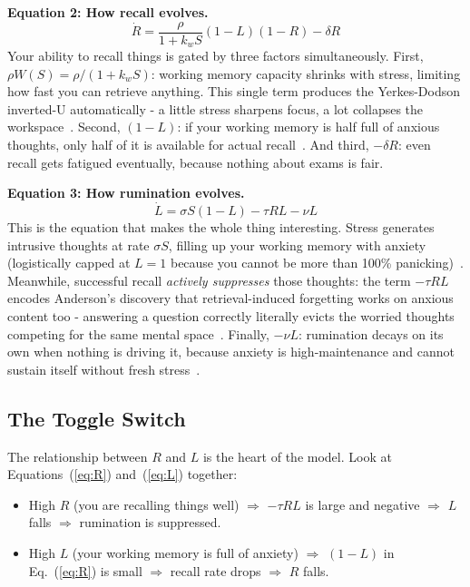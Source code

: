 \documentclass[11pt,a4paper]{article}
\begin{document}
\textbf{Equation 2: How recall evolves.}
\begin{equation}
  \dot{R} = \frac{\rho}{1 + k_w S}(1-L)(1-R) - \delta R
  \label{eq:R}
\end{equation}
Your ability to recall things is gated by three factors
simultaneously. First, $\rho W(S) = \rho/(1+k_wS)$: working memory
capacity shrinks with stress, limiting how fast you can retrieve
anything. This single term produces the Yerkes-Dodson inverted-U
automatically - a little stress sharpens focus, a lot collapses the
workspace~\cite{yerkes1908,baddeley1986}. Second, $(1-L)$: if your
working memory is half full of anxious thoughts, only half of it is
available for actual recall~\cite{eysenck2007}. And third, $-\delta
R$: even recall gets fatigued eventually, because nothing about exams
is fair.

\textbf{Equation 3: How rumination evolves.}
\begin{equation}
  \dot{L} = \sigma S(1-L) - \tau R L - \nu L
  \label{eq:L}
\end{equation}
This is the equation that makes the whole thing interesting. Stress
generates intrusive thoughts at rate $\sigma S$, filling up your
working memory with anxiety (logistically capped at $L=1$ because
you cannot be more than 100\% panicking)~\cite{eysenck2007}.
Meanwhile, successful recall \emph{actively suppresses} those
thoughts: the term $-\tau RL$ encodes Anderson's discovery that
retrieval-induced forgetting works on anxious content too - answering
a question correctly literally evicts the worried thoughts competing
for the same mental space~\cite{anderson2003}. Finally, $-\nu L$:
rumination decays on its own when nothing is driving it, because
anxiety is high-maintenance and cannot sustain itself without fresh
stress~\cite{borkovec1994}.

\subsection{The Toggle Switch}

The relationship between $R$ and $L$ is the heart of the model.
Look at Equations~(\ref{eq:R}) and~(\ref{eq:L}) together:

\begin{itemize}
  \item High $R$ (you are recalling things well) $\Rightarrow$
    $-\tau RL$ is large and negative $\Rightarrow$ $L$ falls
    $\Rightarrow$ rumination is suppressed.
  \item High $L$ (your working memory is full of anxiety)
    $\Rightarrow$ $(1-L)$ in Eq.~(\ref{eq:R}) is small
    $\Rightarrow$ recall rate drops $\Rightarrow$ $R$ falls.
\end{itemize}
\end{document}
